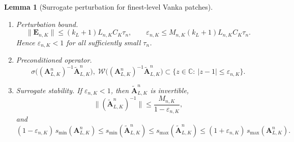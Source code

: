 \documentclass[DIV=16]{scrartcl}
\newtheorem{lemma}[theorem]{Lemma}
\begin{document}
\begin{lemma}[Surrogate perturbation for finest-level Vanka patches]
\begin{enumerate}[label=(\alph*),leftmargin=*,itemsep=2pt,topsep=2pt,parsep=0pt]
\item \emph{Perturbation bound.}
\begin{equation}\label{eq:patch-perturbation-bound}
  \|\bm E_{n,K}\|
  \le (k_L+1)L_{n,K}C_K\tau_n,
  \qquad
  \varepsilon_{n,K}
  \le M_{n,K}(k_L+1)L_{n,K}C_K\tau_n.
\end{equation}
Hence \(\varepsilon_{n,K}<1\) for all sufficiently small \(\tau_n\).

\item \emph{Preconditioned operator.}
\begin{equation}\label{eq:patch-spectrum-fov}
  \sigma\!\bigl((\bm A_{L,K}^n)^{-1}\tilde{\bm A}_{L,K}^n\bigr),\;
  \mathcal W\!\bigl((\bm A_{L,K}^n)^{-1}\tilde{\bm A}_{L,K}^n\bigr)
  \subset
  \{z\in\mathbb C:\ |z-1|\le \varepsilon_{n,K}\}.
\end{equation}

\item \emph{Surrogate stability.}
If \(\varepsilon_{n,K}<1\), then \(\tilde{\bm A}_{L,K}^n\) is invertible,
\begin{equation}\label{eq:patch-inverse-bound}
  \|(\tilde{\bm A}_{L,K}^n)^{-1}\|
  \le \frac{M_{n,K}}{1-\varepsilon_{n,K}},
\end{equation}
and
\begin{equation}\label{eq:patch-sv-bounds}
  (1-\varepsilon_{n,K})\,s_{\min}(\bm A_{L,K}^n)
  \le s_{\min}(\tilde{\bm A}_{L,K}^n)
  \le s_{\max}(\tilde{\bm A}_{L,K}^n)
  \le (1+\varepsilon_{n,K})\,s_{\max}(\bm A_{L,K}^n).
\end{equation}
\end{enumerate}
\end{lemma}
\end{document}
